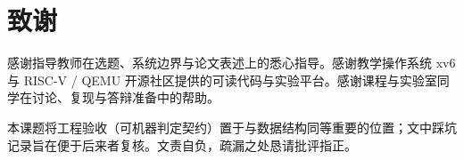 \chapter*{致\quad 谢}

感谢指导教师在选题、系统边界与论文表述上的悉心指导。感谢教学操作系统 xv6 与 RISC-V / QEMU 开源社区提供的可读代码与实验平台。感谢课程与实验室同学在讨论、复现与答辩准备中的帮助。

本课题将工程验收（可机器判定契约）置于与数据结构同等重要的位置；文中踩坑记录旨在便于后来者复核。文责自负，疏漏之处恳请批评指正。
